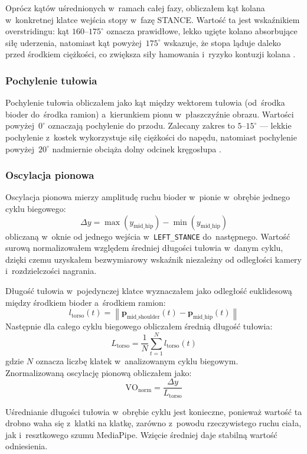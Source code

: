 Oprócz kątów uśrednionych w~ramach całej fazy, obliczałem kąt kolana w~konkretnej klatce wejścia stopy w~fazę STANCE. Wartość ta jest wskaźnikiem overstridingu: kąt $160$--$175^\circ$ oznacza prawidłowe, lekko ugięte kolano absorbujące siłę uderzenia, natomiast kąt powyżej~$175^\circ$ wskazuje, że stopa ląduje daleko przed środkiem ciężkości, co zwiększa siły hamowania i~ryzyko kontuzji kolana \cite{heiderscheit2011}.

\subsubsection{Pochylenie tułowia}

Pochylenie tułowia obliczałem jako kąt między wektorem tułowia (od~środka bioder do~środka ramion) a~kierunkiem pionu w~płaszczyźnie obrazu. Wartości powyżej~$0^\circ$ oznaczają pochylenie do przodu. Zalecany zakres to $5$--$15^\circ$ --- lekkie pochylenie z~kostek wykorzystuje siłę ciężkości do napędu, natomiast pochylenie powyżej~$20^\circ$ nadmiernie obciąża dolny odcinek kręgosłupa \cite{novacheck1998}.

\subsubsection{Oscylacja pionowa}

Oscylacja pionowa  mierzy amplitudę ruchu bioder w~pionie w~obrębie jednego cyklu biegowego:
\[
\Delta y = \max(y_{\text{mid\_hip}}) - \min(y_{\text{mid\_hip}})
\]
obliczaną w~oknie od jednego wejścia w~\texttt{LEFT\_STANCE} do~następnego. Wartość surową normalizowałem względem średniej długości tułowia w~danym cyklu, dzięki czemu uzyskałem bezwymiarowy wskaźnik niezależny od odległości kamery i~rozdzielczości nagrania.

Długość tułowia w~pojedynczej klatce wyznaczałem jako odległość euklidesową między środkiem bioder a~środkiem ramion:
\[
l_{\text{torso}}(t) = \left\| \mathbf{p}_{\text{mid\_shoulder}}(t) - \mathbf{p}_{\text{mid\_hip}}(t) \right\|
\]
Następnie dla całego cyklu biegowego obliczałem średnią długość tułowia:
\[
L_{\text{torso}} = \frac{1}{N} \sum_{t=1}^{N} l_{\text{torso}}(t)
\]
gdzie $N$ oznacza liczbę klatek w~analizowanym cyklu biegowym.\\ Znormalizowaną oscylację pionową obliczałem jako:
\[
\text{VO}_{\text{norm}} = \frac{\Delta y}{L_{\text{torso}}}
\]

Uśrednianie długości tułowia w~obrębie cyklu jest konieczne, ponieważ wartość ta drobno waha się z~klatki na klatkę, zarówno z~powodu rzeczywistego ruchu ciała, jak i~resztkowego szumu MediaPipe. Wzięcie średniej daje stabilną wartość odniesienia.

